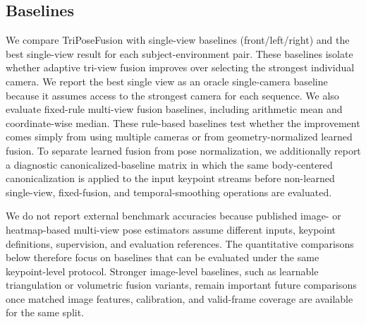 \documentclass[runningheads]{llncs}
\begin{document}
\subsection{Baselines}
We compare TriPoseFusion with single-view baselines (front/left/right) and the best single-view result for each subject-environment pair. These baselines isolate whether adaptive tri-view fusion improves over selecting the strongest individual camera. We report the best single view as an oracle single-camera baseline because it assumes access to the strongest camera for each sequence. We also evaluate fixed-rule multi-view fusion baselines, including arithmetic mean and coordinate-wise median. These rule-based baselines test whether the improvement comes simply from using multiple cameras or from geometry-normalized learned fusion. To separate learned fusion from pose normalization, we additionally report a diagnostic canonicalized-baseline matrix in which the same body-centered canonicalization is applied to the input keypoint streams before non-learned single-view, fixed-fusion, and temporal-smoothing operations are evaluated.

We do not report external benchmark accuracies because published image- or heatmap-based multi-view pose estimators assume different inputs, keypoint definitions, supervision, and evaluation references. The quantitative comparisons below therefore focus on baselines that can be evaluated under the same keypoint-level protocol. Stronger image-level baselines, such as learnable triangulation or volumetric fusion variants, remain important future comparisons once matched image features, calibration, and valid-frame coverage are available for the same split.
\end{document}
